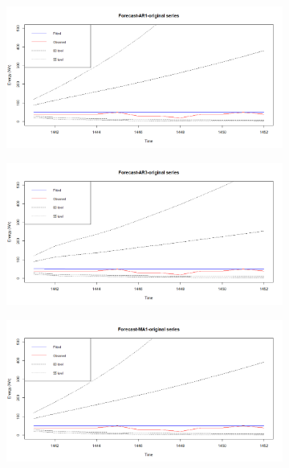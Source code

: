 \documentclass[12pt]{article}
\begin{document}
\begin{figure}[H]
  \centering
  \begin{subfigure}[b]{0.6\linewidth}
    \includegraphics[width=\linewidth]{figure14-1.png}
  \end{subfigure}
  \begin{subfigure}[b]{0.6\linewidth}
    \includegraphics[width=\linewidth]{figure14-2.png}
  \end{subfigure}
  \begin{subfigure}[b]{0.6\linewidth}
    \includegraphics[width=\linewidth]{figure14-3.png}
  \end{subfigure}

\end{figure}
\end{document}
